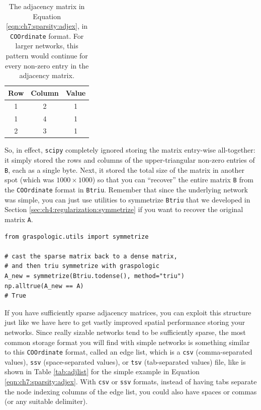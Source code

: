 \begin{table}[h]
    \centering
    \begin{tabular}{c|c| c}
        Row & Column & Value \\
        \hline
         1 & 2 & 1\\
         1 & 4 &  1 \\
         2 & 3 &  1
    \end{tabular}
    \caption[\texttt{COOrdinate format} for sparse matrices]{The adjacency matrix in Equation \eqref{eqn:ch7:sparsity:adjex}, in \texttt{COOrdinate} format. For larger networks, this pattern would continue for every non-zero entry in the adjacency matrix.}
    \label{tab:coordfmt}
\end{table}

So, in effect, \texttt{scipy} completely ignored storing the matrix entry-wise all-together: it simply stored the rows and columns of the upper-triangular non-zero entries of \texttt{B}, each as a single byte. Next, it stored the total size of the matrix in another spot (which was $1000 \times 1000$) so that you can ``recover'' the entire matrix \texttt{B} from the \texttt{COOrdinate} format in \texttt{Btriu}. Remember that since the underlying network was simple, you can just use utilities to symmetrize \texttt{Btriu} that we developed in Section \ref{sec:ch4:regularization:symmetrize} if you want to recover the original matrix \texttt{A}.

\begin{lstlisting}[style=python]
from graspologic.utils import symmetrize

# cast the sparse matrix back to a dense matrix,
# and then triu symmetrize with graspologic
A_new = symmetrize(Btriu.todense(), method="triu")
np.alltrue(A_new == A)
# True
\end{lstlisting}
If you have sufficiently sparse adjacency matrices, you can exploit this structure just like we have here to get vastly improved spatial performance storing your networks. Since really sizable networks tend to be sufficiently sparse, the most common storage format you will find with simple networks is something similar to this \texttt{COOrdinate} format, called an edge list, which is a \texttt{csv} (comma-separated values), \texttt{ssv} (space-separated values), or \texttt{tsv} (tab-separated values) file, like is shown in Table \ref{tab:adjlist} for the simple example in Equation \eqref{eqn:ch7:sparsity:adjex}. With \texttt{csv} or \texttt{ssv} formats, instead of having tabs separate the node indexing columns of the edge list, you could also have spaces or commas (or any suitable delimiter). 

